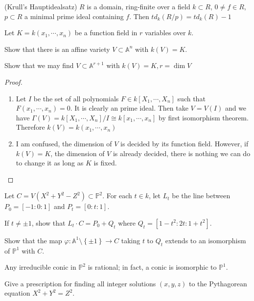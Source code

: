 \documentclass{solution}
\begin{document}
\begin{proposition}
    (Krull’s Hauptidealsatz) $R$ is a domain, ring-finite over a field $k \subset R$, $0 \ne f \in R$, $p \subset R$ a minimal prime ideal containing $f$. Then $td_k(R / p) = td_k(R) - 1$
\end{proposition}

\begin{problem}{6.36}
    Let $K = k(x_1, \cdots, x_n)$ be a function field in $r$ variables over $k$.
    \begin{inparaenum}
        \item Show that there is an affine variety $V \subset \mathbb{A}^n$ with $k(V) = K$.
        \item Show that we may find $V \subset \mathbb{A}^{r + 1}$ with $k(V) = K, r = \dim V$
    \end{inparaenum}
\end{problem}

\begin{proof}
    \begin{enumerate}
        \item Let $I$ be the set of all polynomials $F \in k[X_1, \cdots, X_n]$ such that $F(x_1, \cdots, x_n) = 0$. It is clearly an prime ideal. Then take $V = V(I)$ and we have $\Gamma(V) = k[X_1, \cdots, X_n] / I \cong k[x_1, \cdots, x_n]$ by first isomorphism theorem. Therefore $k(V) = k(x_1, \cdots, x_n)$
        \item {\color{red} I am confused, the dimension of $V$ is decided by its function field. However, if $k(V) = K$, the dimension of $V$ is already decided, there is nothing we can do to change it as long as $K$ is fixed.}
    \end{enumerate}
\end{proof}

\begin{problem}{6.37}
    Let $C = V(X^2 + Y^2 - Z^2) \subset \mathbb{P}^2$. For each $t \in k$, let $L_t$ be the line between $P_0 = [-1:0:1]$ and $P_t = [0:t:1]$. \begin{inparaenum}
        \item If $t \ne \pm 1$, show that $L_t \cdot C = P_0 + Q_t$ where $Q_t = [1 - t^2:2t:1 + t^2]$.
        \item Show that the map $\varphi: \mathbb{A}^1 \setminus \left\lbrace \pm 1 \right\rbrace \rightarrow C$ taking $t$ to $Q_t$ extends to an isomorphism of $\mathbb{P}^1$ with $C$.
        \item Any irreducible conic in $\mathbb{P}^2$ is rational; in fact, a conic is isomorphic to $\mathbb{P}^1$.
        \item Give a prescription for finding all integer solutions $(x, y, z)$ to the Pythagorean equation $X^2 + Y^2 = Z^2$.
    \end{inparaenum}
\end{problem}
\end{document}
